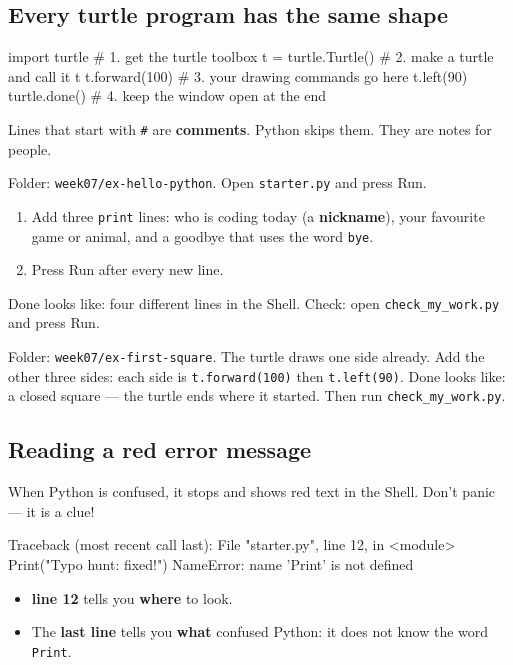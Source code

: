 \subsection{Every turtle program has the same shape}
\begin{pycode}
import turtle            # 1. get the turtle toolbox
t = turtle.Turtle()      # 2. make a turtle and call it t
t.forward(100)           # 3. your drawing commands go here
t.left(90)
turtle.done()            # 4. keep the window open at the end
\end{pycode}
Lines that start with \texttt{\#} are \textbf{comments}. Python skips them. They are notes for people.

\begin{exercise}
Folder: \texttt{week07/ex-hello-python}. Open \texttt{starter.py} and press Run.
\begin{enumerate}[leftmargin=1.4em,itemsep=1pt]
  \item Add three \texttt{print} lines: who is coding today (a \textbf{nickname}), your favourite game or animal, and a goodbye that uses the word \texttt{bye}.
  \item Press Run after every new line.
\end{enumerate}
Done looks like: four different lines in the Shell. Check: open \texttt{check\_my\_work.py} and press Run.
\end{exercise}

\begin{exercise}
Folder: \texttt{week07/ex-first-square}. The turtle draws one side already. Add the other three sides: each side is \texttt{t.forward(100)} then \texttt{t.left(90)}.
Done looks like: a closed square --- the turtle ends where it started. Then run \texttt{check\_my\_work.py}.
\end{exercise}

\subsection{Reading a red error message}
When Python is confused, it stops and shows red text in the Shell. Don't panic --- it is a clue!
\begin{outputcode}
Traceback (most recent call last):
  File "starter.py", line 12, in <module>
    Print("Typo hunt: fixed!")
NameError: name 'Print' is not defined
\end{outputcode}
\begin{itemize}[leftmargin=1.2em,itemsep=1pt]
  \item \textbf{line 12} tells you \textbf{where} to look.
  \item The \textbf{last line} tells you \textbf{what} confused Python: it does not know the word \texttt{Print}.
\end{itemize}

